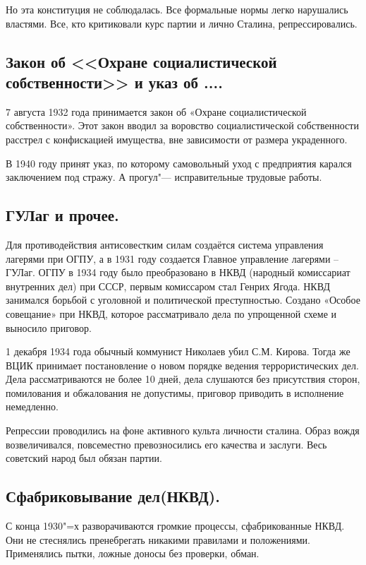 Но эта конституция не соблюдалась. Все формальные нормы легко нарушались властями. Все, кто критиковали курс партии и лично Сталина, репрессировались.

\subsection{Закон об <<Охране социалистической собственности>> и указ об ....}

7 августа 1932 года принимается закон об «Охране социалистической собственности». Этот закон вводил за воровство социалистической собственности расстрел с конфискацией имущества, вне зависимости от размера украденного.

В 1940 году принят указ, по которому самовольный уход с предприятия карался заключением под стражу. А прогул"--- исправительные трудовые работы.

\subsection{ГУЛаг и прочее.}

Для противодействия антисовестким силам создаётся система управления лагерями при ОГПУ, а в 1931 году создается Главное управление лагерями – ГУЛаг. ОГПУ в 1934 году было преобразовано в НКВД (народный комиссариат внутренних дел) при СССР, первым комиссаром стал Генрих Ягода. НКВД занимался борьбой с уголовной и политической преступностью. Создано «Особое совещание» при НКВД, которое рассматривало дела по упрощенной схеме и выносило приговор.

1 декабря 1934 года обычный коммунист Николаев убил С.М. Кирова. Тогда же ВЦИК принимает постановление о новом порядке ведения террористических дел. Дела рассматриваются не более 10 дней, дела слушаются без присутствия сторон, помилования и обжалования не допустимы, приговор приводить в исполнение немедленно.

Репрессии проводились на фоне активного культа личности сталина. Образ вождя возвеличивался, повсеместно превозносились его качества и заслуги. Весь советский народ был обязан партии.

\subsection{Сфабриковывание дел(НКВД).}

С конца 1930"=х разворачиваются громкие процессы, сфабрикованные НКВД. Они не стеснялись пренебрегать никакими правилами и положениями. Применялись пытки, ложные доносы без проверки, обман. 

